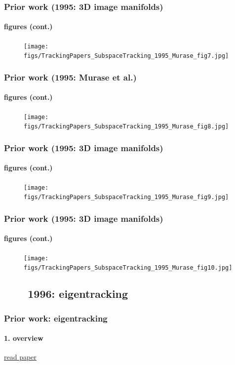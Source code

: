 \begin{frame}
\frametitle{Prior work (1995: 3D image manifolds)}
\framesubtitle{figures (cont.)}
\mypagenum
	\begin{figure}
		\texttt{[image: figs/TrackingPapers\_SubspaceTracking\_1995\_Murase\_fig7.jpg]}
	\end{figure}
\end{frame}



\begin{frame}
\frametitle{Prior work (1995: Murase et al.)}
\framesubtitle{figures (cont.)}
\mypagenum
	\begin{figure}
		\texttt{[image: figs/TrackingPapers\_SubspaceTracking\_1995\_Murase\_fig8.jpg]}
	\end{figure}
\end{frame}



\begin{frame}
\frametitle{Prior work (1995: 3D image manifolds)}
\framesubtitle{figures (cont.)}
\mypagenum
	\begin{figure}
		\texttt{[image: figs/TrackingPapers\_SubspaceTracking\_1995\_Murase\_fig9.jpg]}
	\end{figure}
\end{frame}


\begin{frame}
\frametitle{Prior work (1995: 3D image manifolds)}
\framesubtitle{figures (cont.)}
\mypagenum
	\begin{figure}
		\texttt{[image: figs/TrackingPapers\_SubspaceTracking\_1995\_Murase\_fig10.jpg]}
	\end{figure}
\end{frame}




\subsection{\ \ \ \ 1996: eigentracking}

\begin{frame}
\frametitle{Prior work: eigentracking}
\framesubtitle{1. overview}
\logoCSIPCPL\mypagenum
	{\color{blue}  \href{http://users.ece.gatech.edu/~msalman/papers/1998 JNL, EigenTracking_ robust matching and tracking of articulated objects using a view-based representation (Black, Jepson, IJCV, 810).pdf}{read paper}}
\end{frame}




